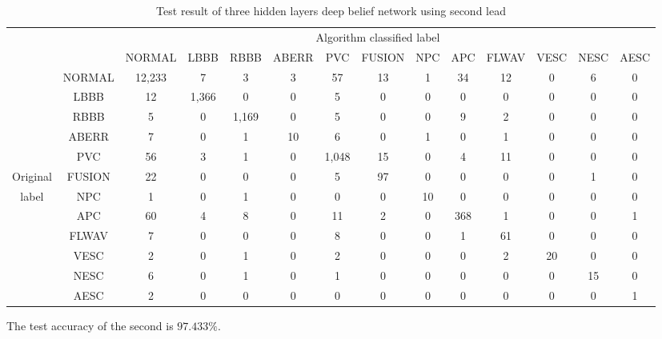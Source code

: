 \documentclass[conference]{IEEEtran}
\begin{document}
\begin{table}[!thbp]
\small
\begin{center}
\begin{lrbox}{\tablebox}
\begin{threeparttable}
\caption{Test result of three hidden layers deep belief network using second lead}
\label{table3}
\begin{tabular}{cccccccccccccc}
\hline
\multicolumn{9}{r}{Algorithm classified label} \\
\cline{3-14}
		 &      & NORMAL & LBBB & RBBB & ABERR & PVC & FUSION & NPC & APC & FLWAV & VESC & NESC & AESC\\
\hline
 		 & NORMAL & 12,233& 7   &  3   &  3   &  57  &  13   &	1   &  34 &   12  &   0  &  6  &  0 \\
	     & LBBB   &  12   & 1,366&  0  &  0   &  5   &  0    &  0   &  0  &   0   &   0  &  0  &  0 \\
		 & RBBB   &  5    &  0  & 1,169&  0   &  5   &  0    &	0   &  9  &   2   &   0  &  0  &  0 \\
		 & ABERR  &  7    &  0  &  1   &  10  &  6   &  0    &	1   &  0  &   1   &   0  &  0  &  0 \\
		 & PVC    &  56   &  3  &  1   &  0   & 1,048&  15   &	0   &  4  &   11  &   0  &  0  &  0 \\
Original & FUSION &	 22   &  0  &  0   &  0   &  5   &   97  &	0   &  0  &   0   &   0  &  1  &  0 \\
label    & NPC    &	 1    &  0  &  1   &  0   &  0   &  0    &	10  &  0  &   0   &   0  &  0  &  0 \\
		 & APC    &	 60   &  4  &  8   &  0   &  11  &  2    &	0   &  368&   1   &   0  &  0  &  1 \\
		 & FLWAV  &	 7    &  0  &  0   &  0   &  8   &  0    &	0   &  1  &   61  &   0  &  0  &  0 \\
		 & VESC   &	 2    &  0  &  1   &  0   &  2   &  0    &	0   &  0  &   2   &  20  &  0  &  0 \\
		 & NESC   &	 6    &  0  &  1   &  0   &  1   &  0    &	0   &  0  &   0   &   0  &  15 &  0 \\
		 & AESC   &	 2    &  0  &  0   &  0   &  0   &  0    &	0   &  0  &   0   &   0  &  0  &  1 \\
\hline
\end{tabular}
\begin{tablenotes}
\item The test accuracy of the second is $97.433\%$.
\end{tablenotes}
\end{threeparttable}
\end{lrbox}
\scalebox{0.96}{\usebox{\tablebox}}
\end{center}
\end{table}
\end{document}
